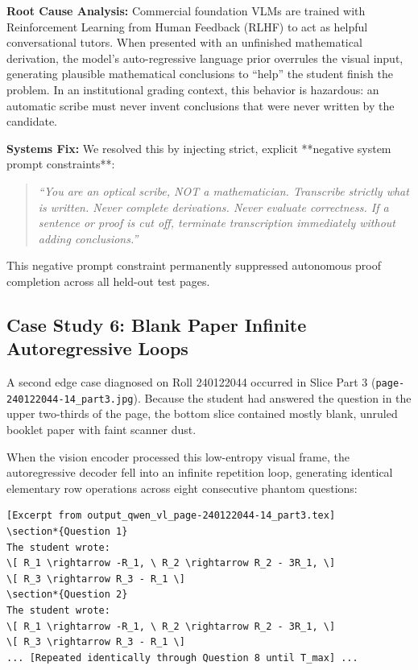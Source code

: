 \textbf{Root Cause Analysis:} Commercial foundation VLMs are trained with Reinforcement Learning from Human Feedback (RLHF) to act as helpful conversational tutors. When presented with an unfinished mathematical derivation, the model's auto-regressive language prior overrules the visual input, generating plausible mathematical conclusions to ``help'' the student finish the problem. In an institutional grading context, this behavior is hazardous: an automatic scribe must never invent conclusions that were never written by the candidate.

\textbf{Systems Fix:} We resolved this by injecting strict, explicit **negative system prompt constraints**:
\begin{quote}
\textit{``You are an optical scribe, NOT a mathematician. Transcribe strictly what is written. Never complete derivations. Never evaluate correctness. If a sentence or proof is cut off, terminate transcription immediately without adding conclusions.''}
\end{quote}
This negative prompt constraint permanently suppressed autonomous proof completion across all held-out test pages.

\subsection{Case Study 6: Blank Paper Infinite Autoregressive Loops}
\label{sec:blank_paper_loop}
A second edge case diagnosed on Roll 240122044 occurred in Slice Part 3 (\texttt{page-240122044-14\_part3.jpg}). Because the student had answered the question in the upper two-thirds of the page, the bottom slice contained mostly blank, unruled booklet paper with faint scanner dust.

When the vision encoder processed this low-entropy visual frame, the autoregressive decoder fell into an infinite repetition loop, generating identical elementary row operations across eight consecutive phantom questions:
\begin{footnotesize}
\begin{verbatim}
[Excerpt from output_qwen_vl_page-240122044-14_part3.tex]
\section*{Question 1}
The student wrote:
\[ R_1 \rightarrow -R_1, \ R_2 \rightarrow R_2 - 3R_1, \]
\[ R_3 \rightarrow R_3 - R_1 \]
\section*{Question 2}
The student wrote:
\[ R_1 \rightarrow -R_1, \ R_2 \rightarrow R_2 - 3R_1, \]
\[ R_3 \rightarrow R_3 - R_1 \]
... [Repeated identically through Question 8 until T_max] ...
\end{verbatim}
\end{footnotesize}

